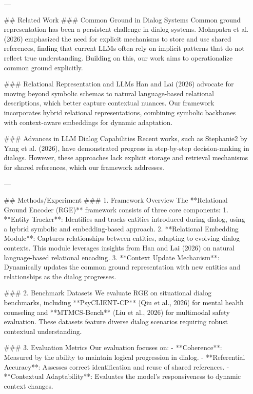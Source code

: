 ---

## Related Work
### Common Ground in Dialog Systems
Common ground representation has been a persistent challenge in dialog systems. Mohapatra et al. (2026) emphasized the need for explicit mechanisms to store and use shared references, finding that current LLMs often rely on implicit patterns that do not reflect true understanding. Building on this, our work aims to operationalize common ground explicitly.

### Relational Representation and LLMs
Han and Lai (2026) advocate for moving beyond symbolic schemas to natural language-based relational descriptions, which better capture contextual nuances. Our framework incorporates hybrid relational representations, combining symbolic backbones with context-aware embeddings for dynamic adaptation.

### Advances in LLM Dialog Capabilities
Recent works, such as Stephanie2 by Yang et al. (2026), have demonstrated progress in step-by-step decision-making in dialogs. However, these approaches lack explicit storage and retrieval mechanisms for shared references, which our framework addresses.

---

## Methods/Experiment
### 1. Framework Overview
The **Relational Ground Encoder (RGE)** framework consists of three core components:
1. **Entity Tracker**: Identifies and tracks entities introduced during dialog, using a hybrid symbolic and embedding-based approach.
2. **Relational Embedding Module**: Captures relationships between entities, adapting to evolving dialog contexts. This module leverages insights from Han and Lai (2026) on natural language-based relational encoding.
3. **Context Update Mechanism**: Dynamically updates the common ground representation with new entities and relationships as the dialog progresses.

### 2. Benchmark Datasets
We evaluate RGE on situational dialog benchmarks, including **PsyCLIENT-CP** (Qiu et al., 2026) for mental health counseling and **MTMCS-Bench** (Liu et al., 2026) for multimodal safety evaluation. These datasets feature diverse dialog scenarios requiring robust contextual understanding.

### 3. Evaluation Metrics
Our evaluation focuses on:
- **Coherence**: Measured by the ability to maintain logical progression in dialog.
- **Referential Accuracy**: Assesses correct identification and reuse of shared references.
- **Contextual Adaptability**: Evaluates the model's responsiveness to dynamic context changes.

